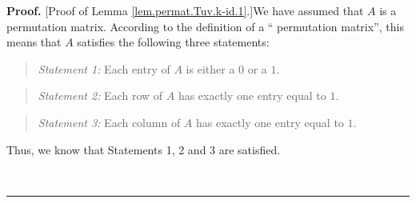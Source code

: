\documentclass[numbers=enddot,12pt,final,onecolumn,notitlepage]{scrartcl}%
\theoremstyle{definition}
\newenvironment{statement}{\begin{quote}}{\end{quote}}
\newenvironment{proof}[1][Proof]{\noindent\textbf{#1.} }{\ \rule{0.5em}{0.5em}}
\begin{document}
\begin{proof}
[Proof of Lemma \ref{lem.permat.Tuv.k-id.1}.]We have assumed that $A$ is a
permutation matrix. According to the definition of a \textquotedblleft
permutation matrix\textquotedblright, this means that $A$ satisfies the
following three statements:

\begin{statement}
\textit{Statement 1:} Each entry of $A$ is either a $0$ or a $1$.
\end{statement}

\begin{statement}
\textit{Statement 2:} Each row of $A$ has exactly one entry equal to $1$.
\end{statement}

\begin{statement}
\textit{Statement 3:} Each column of $A$ has exactly one entry equal to $1$.
\end{statement}

Thus, we know that Statements 1, 2 and 3 are satisfied.


\end{proof}
\end{document}
